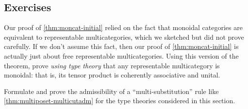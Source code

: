 \subsection*{Exercises}

\begin{ex}\label{ex:repmulticat-moncat}
  Our proof of \cref{thm:moncat-initial} relied on the fact that monoidal categories are equivalent to representable multicategories, which we sketched but did not prove carefully.
  If we don't assume this fact, then our proof of \cref{thm:moncat-initial} is actually just about free representable multicategories.
  Using this version of the theorem, prove \emph{using type theory} that any representable multicategory is monoidal: that is, its tensor product is coherently associative and unital.
\end{ex}

\begin{ex}\label{ex:moncat-multisubadm}
  Formulate and prove the admissibility of a ``multi-substitution'' rule like \cref{thm:multiposet-multicutadm} for the type theories considered in this section.
\end{ex}


